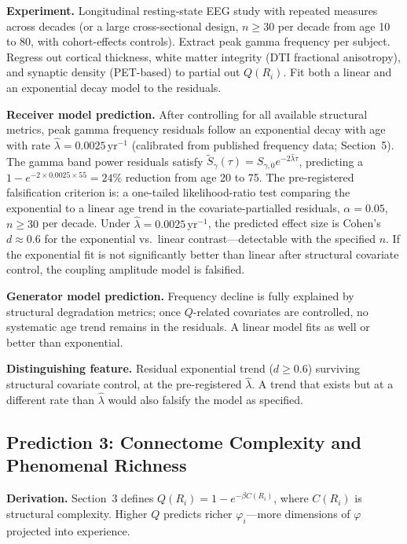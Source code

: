 \documentclass[12pt]{article}
\begin{document}
\textbf{Experiment.} Longitudinal resting-state EEG study with repeated measures across decades (or a large cross-sectional design, $n \geq 30$ per decade from age 10 to 80, with cohort-effects controls). Extract peak gamma frequency per subject. Regress out cortical thickness, white matter integrity (DTI fractional anisotropy), and synaptic density (PET-based) to partial out $Q(R_i)$. Fit both a linear and an exponential decay model to the residuals.

\textbf{Receiver model prediction.} After controlling for all available structural metrics, peak gamma frequency residuals follow an exponential decay with age with rate $\hat{\lambda} = 0.0025\,\mathrm{yr}^{-1}$ (calibrated from published frequency data; Section~5). The gamma band power residuals satisfy $\tilde{S}_\gamma(\tau) = S_{\gamma,0}e^{-2\hat{\lambda}\tau}$, predicting a $1 - e^{-2\times 0.0025\times 55} = 24\%$ reduction from age 20 to 75. The pre-registered falsification criterion is: a one-tailed likelihood-ratio test comparing the exponential to a linear age trend in the covariate-partialled residuals, $\alpha = 0.05$, $n \geq 30$ per decade. Under $\hat{\lambda} = 0.0025\,\mathrm{yr}^{-1}$, the predicted effect size is Cohen's $d \approx 0.6$ for the exponential vs.\ linear contrast---detectable with the specified $n$. If the exponential fit is not significantly better than linear after structural covariate control, the coupling amplitude model is falsified.

\textbf{Generator model prediction.} Frequency decline is fully explained by structural degradation metrics; once $Q$-related covariates are controlled, no systematic age trend remains in the residuals. A linear model fits as well or better than exponential.

\textbf{Distinguishing feature.} Residual exponential trend ($d \geq 0.6$) surviving structural covariate control, at the pre-registered $\hat{\lambda}$. A trend that exists but at a different rate than $\hat{\lambda}$ would also falsify the model as specified.

\subsection{Prediction 3: Connectome Complexity and Phenomenal Richness}

\textbf{Derivation.} Section~3 defines $Q(R_i) = 1 - e^{-\beta C(R_i)}$, where $C(R_i)$ is structural complexity. Higher $Q$ predicts richer $\varphi_i$---more dimensions of $\varphi$ projected into experience.
\end{document}
